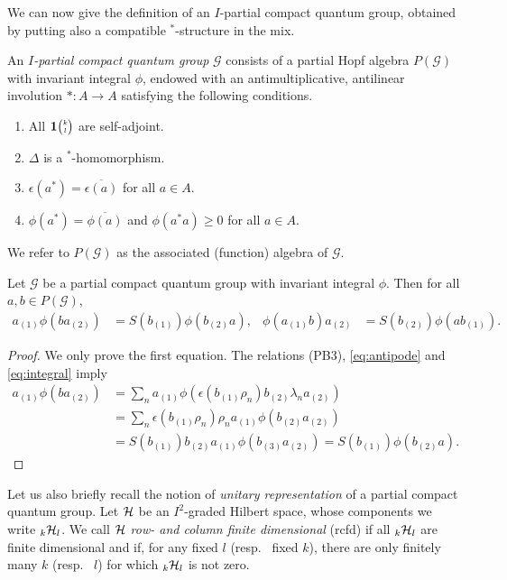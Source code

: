 We can now give the definition of an $I$-partial compact quantum group, obtained by putting also a compatible $^*$-structure in the mix.

\begin{Def} \label{def:pcqg} An \emph{$I$-partial compact quantum group} $\mathscr{G}$ consists of a partial Hopf algebra $P(\mathscr{G})$ with invariant integral $\phi$, endowed with an antimultiplicative, antilinear involution $*:A\rightarrow A$ satisfying the following conditions.
\begin{enumerate}
\item All $\mathbf{1}{\tiny {\begin{pmatrix} k\\l\end{pmatrix}}}$ are self-adjoint.
\item $\Delta$ is a $^*$-homomorphism.
\item $\epsilon(a^*) = \overline{\epsilon(a)}$ for all $a\in A$. 
\item $\phi(a^*) = \overline{\phi(a)}$ and $\phi(a^*a)\geq 0$ for all $a\in A$.
\end{enumerate}
\end{Def} 

We refer to $P(\mathscr{G})$ as the associated (function) algebra of $\mathscr{G}$.

\begin{Lem} \label{lem:strong-invariance}
  Let $\mathscr{G}$ be a partial compact quantum group with invariant  integral $\phi$. Then
  for all $a,b\in P(\mathscr{G})$,
  \begin{align*}
a_{(1)}\phi(ba_{(2)}) &= S(b_{(1)})\phi(b_{(2)}a), &
\phi(a_{(1)}b)a_{(2)} &= S(b_{(2)})\phi(ab_{(1)}).    
  \end{align*}
\end{Lem}
\begin{proof}
We only prove the first equation. The relations (PB3),
 \eqref{eq:antipode} and \eqref{eq:integral} imply
  \begin{align*}
    a_{(1)}\phi(ba_{(2)}) &= \sum_{n}
    a_{(1)}\phi(\epsilon(b_{(1)}\rho_{n})b_{(2)}\lambda_{n}a_{(2)}) \\
    &= \sum_{n} \epsilon(b_{(1)}\rho_{n})\rho_{n}a_{(1)}\phi(b_{(2)}a_{(2)})
    \\
    &= S(b_{(1)})b_{(2)}a_{(1)}\phi(b_{(3)}a_{(2)}) =
    S(b_{(1)})\phi(b_{(2)}a). 
  \end{align*}
\end{proof}



Let us also briefly recall the notion of \emph{unitary representation} of a partial compact quantum group. Let $\mathcal{H}$ be an $I^2$-graded Hilbert space, whose components we write ${}_{k}\mathcal{H}_{l}$. We call $\mathcal{H}$ \emph{row- and column finite dimensional} (rcfd) if all ${}_{k}\mathcal{H}_{l}$ are finite dimensional and if, for any fixed $l$ (resp.~ fixed $k$), there are only finitely many $k$ (resp.~ $l$) for which ${}_{k}\mathcal{H}_{l}$ is not zero.  

